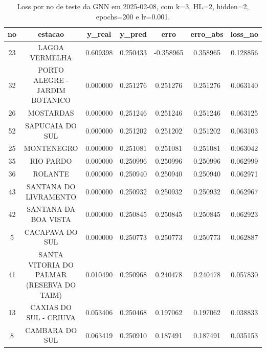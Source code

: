 \begin{table}[h]
\centering
\caption{Loss por no de teste da GNN em 2025-02-08, com k=3, HL=2, hidden=2, epochs=200 e lr=0.001.}
\label{tab:gnn_loss_k3_hl2_h2_e200_d20250208}
\begin{tabular}{ccccccc}
\toprule
no & estacao & y\_real & y\_pred & erro & erro\_abs & loss\_no \\
\midrule
23 & LAGOA VERMELHA & 0.609398 & 0.250433 & -0.358965 & 0.358965 & 0.128856 \\
32 & PORTO ALEGRE - JARDIM BOTANICO & 0.000000 & 0.251276 & 0.251276 & 0.251276 & 0.063140 \\
26 & MOSTARDAS & 0.000000 & 0.251246 & 0.251246 & 0.251246 & 0.063125 \\
52 & SAPUCAIA DO SUL & 0.000000 & 0.251202 & 0.251202 & 0.251202 & 0.063103 \\
25 & MONTENEGRO & 0.000000 & 0.251081 & 0.251081 & 0.251081 & 0.063042 \\
35 & RIO PARDO & 0.000000 & 0.250996 & 0.250996 & 0.250996 & 0.062999 \\
36 & ROLANTE & 0.000000 & 0.250940 & 0.250940 & 0.250940 & 0.062971 \\
43 & SANTANA DO LIVRAMENTO & 0.000000 & 0.250932 & 0.250932 & 0.250932 & 0.062967 \\
42 & SANTANA DA BOA VISTA & 0.000000 & 0.250845 & 0.250845 & 0.250845 & 0.062923 \\
5 & CACAPAVA DO SUL & 0.000000 & 0.250773 & 0.250773 & 0.250773 & 0.062887 \\
41 & SANTA VITORIA DO PALMAR (RESERVA DO TAIM) & 0.010490 & 0.250968 & 0.240478 & 0.240478 & 0.057830 \\
13 & CAXIAS DO SUL - CRIUVA & 0.053406 & 0.250468 & 0.197062 & 0.197062 & 0.038833 \\
8 & CAMBARA DO SUL & 0.063419 & 0.250910 & 0.187491 & 0.187491 & 0.035153 \\
\bottomrule
\end{tabular}
\end{table}
